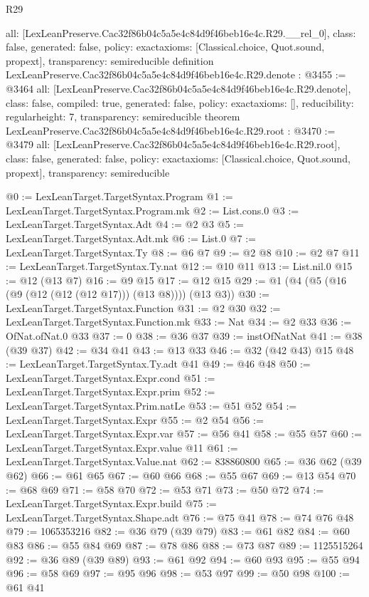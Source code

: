 \begin{lexlean}{R29}
\begin{coremodule}
{  all: [LexLeanPreserve.Cac32f86b04c5a5e4c84d9f46beb16e4c.R29.__rel_0],
  class: false,
  generated: false,
  policy: exact{axioms: [Classical.choice, Quot.sound, propext]},
  transparency: semireducible
}
definition LexLeanPreserve.Cac32f86b04c5a5e4c84d9f46beb16e4c.R29.denote : @3455 := @3464 {
  all: [LexLeanPreserve.Cac32f86b04c5a5e4c84d9f46beb16e4c.R29.denote],
  class: false,
  compiled: true,
  generated: false,
  policy: exact{axioms: []},
  reducibility: regular{height: 7},
  transparency: semireducible
}
theorem LexLeanPreserve.Cac32f86b04c5a5e4c84d9f46beb16e4c.R29.root : @3470 := @3479 {
  all: [LexLeanPreserve.Cac32f86b04c5a5e4c84d9f46beb16e4c.R29.root],
  class: false,
  generated: false,
  policy: exact{axioms: [Classical.choice, Quot.sound, propext]},
  transparency: semireducible
}

@0 := LexLeanTarget.TargetSyntax.Program
@1 := LexLeanTarget.TargetSyntax.Program.mk
@2 := List.cons.{0}
@3 := LexLeanTarget.TargetSyntax.Adt
@4 := @2 @3
@5 := LexLeanTarget.TargetSyntax.Adt.mk
@6 := List.{0}
@7 := LexLeanTarget.TargetSyntax.Ty
@8 := @6 @7
@9 := @2 @8
@10 := @2 @7
@11 := LexLeanTarget.TargetSyntax.Ty.nat
@12 := @10 @11
@13 := List.nil.{0}
@15 := @12 (@13 @7)
@16 := @9 @15
@17 := @12 @15
@29 := @1 (@4 (@5 (@16 (@9 (@12 (@12 (@12 @17))) (@13 @8)))) (@13 @3))
@30 := LexLeanTarget.TargetSyntax.Function
@31 := @2 @30
@32 := LexLeanTarget.TargetSyntax.Function.mk
@33 := Nat
@34 := @2 @33
@36 := OfNat.ofNat.{0} @33
@37 := 0
@38 := @36 @37
@39 := instOfNatNat
@41 := @38 (@39 @37)
@42 := @34 @41
@43 := @13 @33
@46 := @32 (@42 @43) @15
@48 := LexLeanTarget.TargetSyntax.Ty.adt @41
@49 := @46 @48
@50 := LexLeanTarget.TargetSyntax.Expr.cond
@51 := LexLeanTarget.TargetSyntax.Expr.prim
@52 := LexLeanTarget.TargetSyntax.Prim.natLe
@53 := @51 @52
@54 := LexLeanTarget.TargetSyntax.Expr
@55 := @2 @54
@56 := LexLeanTarget.TargetSyntax.Expr.var
@57 := @56 @41
@58 := @55 @57
@60 := LexLeanTarget.TargetSyntax.Expr.value @11
@61 := LexLeanTarget.TargetSyntax.Value.nat
@62 := 838860800
@65 := @36 @62 (@39 @62)
@66 := @61 @65
@67 := @60 @66
@68 := @55 @67
@69 := @13 @54
@70 := @68 @69
@71 := @58 @70
@72 := @53 @71
@73 := @50 @72
@74 := LexLeanTarget.TargetSyntax.Expr.build
@75 := LexLeanTarget.TargetSyntax.Shape.adt
@76 := @75 @41
@78 := @74 @76 @48
@79 := 1065353216
@82 := @36 @79 (@39 @79)
@83 := @61 @82
@84 := @60 @83
@86 := @55 @84 @69
@87 := @78 @86
@88 := @73 @87
@89 := 1125515264
@92 := @36 @89 (@39 @89)
@93 := @61 @92
@94 := @60 @93
@95 := @55 @94
@96 := @58 @69
@97 := @95 @96
@98 := @53 @97
@99 := @50 @98
@100 := @61 @41

\end{coremodule}
\end{lexlean}
